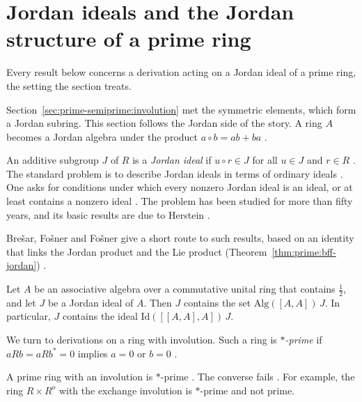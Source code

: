 \section{Jordan ideals and the Jordan structure of a prime ring}\label{sec:prime-semiprime:jordan-ideals}

Every result below concerns a derivation acting on a Jordan ideal of a prime ring, the setting the section treats.

Section~\ref{sec:prime-semiprime:involution} met the symmetric elements, which
form a Jordan subring. This section follows the Jordan side of the story. A ring
$A$ becomes a Jordan algebra under the product $a\circ b=ab+ba$
\cite[p.~1]{BresarFosnerFosner2005}.

An additive subgroup $J$ of $R$ is a \emph{Jordan ideal} if $u\circ r\in J$ for
all $u\in J$ and $r\in R$ \cite[p.~415]{Oukhtite2011}. The standard problem is to
describe Jordan ideals in terms of ordinary ideals
\cite[p.~1]{BresarFosnerFosner2005}. One asks for conditions under which every
nonzero Jordan ideal is an ideal, or at least contains a nonzero ideal
\cite[p.~1]{BresarFosnerFosner2005}. The problem has been studied for more
than fifty years, and its basic results are due to Herstein
\cite[p.~1]{BresarFosnerFosner2005}.

Bre\v{s}ar, Fo\v{s}ner and Fo\v{s}ner give a short route to such results, based on
an identity that links the Jordan product and the Lie product (Theorem~\ref{thm:prime:bff-jordan})
\cite[p.~1]{BresarFosnerFosner2005}.\begin{theorem}\label{thm:prime:bff-jordan}
Let $A$ be an associative algebra over a commutative unital ring that contains
$\tfrac12$, and let $J$ be a Jordan ideal of $A$. Then $J$ contains the set
$\mathrm{Alg}([A,A])\,J$. In particular, $J$ contains the ideal
$\mathrm{Id}([[A,A],A])\,J$.
\end{theorem}

We turn to derivations on a ring with involution. Such a ring is
\emph{$*$-prime} if $aRb=aRb^*=0$ implies $a=0$ or $b=0$
\cite[p.~415]{Oukhtite2011}.

A prime ring with an involution is $*$-prime \cite[p.~415]{Oukhtite2011}. The
converse fails \cite[p.~415]{Oukhtite2011}. For example, the ring
$R\times R^{o}$ with the exchange involution is $*$-prime and not prime.

